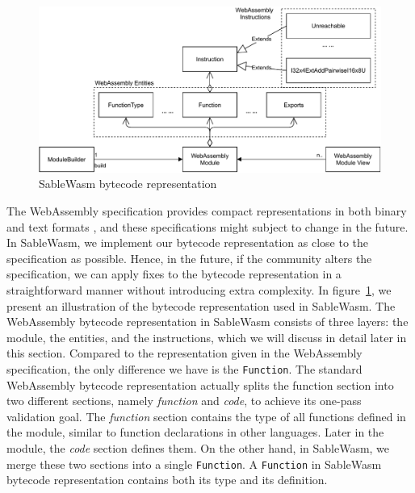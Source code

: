\begin{figure}
  \centering
  \includegraphics[width=\textwidth]{Images/sablewasm-bytecode.pdf}
  \caption{SableWasm bytecode representation}
  \label{fig:sablewasm-bytecode}
\end{figure}

The WebAssembly specification provides compact representations in both binary
and text formats \cite{10.1145/3062341.3062363}, and these specifications might
subject to change in the future. In SableWasm, we implement our bytecode
representation as close to the specification as possible. Hence, in the future,
if the community alters the specification, we can apply fixes to the bytecode
representation in a straightforward manner without introducing extra complexity.
In figure~\ref{fig:sablewasm-bytecode}, we present an illustration of the
bytecode representation used in SableWasm. The WebAssembly bytecode
representation in SableWasm consists of three layers: the module, the entities,
and the instructions, which we will discuss in detail later in this section.
Compared to the representation given in the WebAssembly specification, the only
difference we have is the \texttt{Function}. The standard WebAssembly bytecode
representation actually splits the function section into two different sections,
namely \emph{function} and \emph{code}, to achieve its one-pass validation goal.
The \emph{function} section contains the type of all functions defined in the
module, similar to function declarations in other languages. Later in the
module, the \emph{code} section defines them. On the other hand, in SableWasm,
we merge these two sections into a single \texttt{Function}. A \texttt{Function}
in SableWasm bytecode representation contains both its type and its definition.

